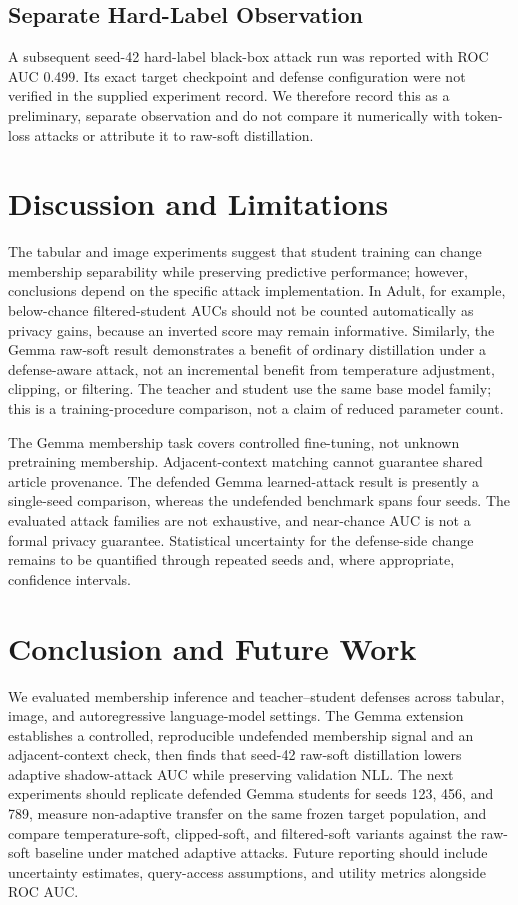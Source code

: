 \documentclass[conference]{IEEEtran}
\begin{document}
\subsection{Separate Hard-Label Observation}
A subsequent seed-42 hard-label black-box attack run was reported with ROC AUC 0.499. Its exact target checkpoint and defense configuration were not verified in the supplied experiment record. We therefore record this as a preliminary, separate observation and do not compare it numerically with token-loss attacks or attribute it to raw-soft distillation.

\section{Discussion and Limitations}
The tabular and image experiments suggest that student training can change membership separability while preserving predictive performance; however, conclusions depend on the specific attack implementation. In Adult, for example, below-chance filtered-student AUCs should not be counted automatically as privacy gains, because an inverted score may remain informative. Similarly, the Gemma raw-soft result demonstrates a benefit of ordinary distillation under a defense-aware attack, not an incremental benefit from temperature adjustment, clipping, or filtering. The teacher and student use the same base model family; this is a training-procedure comparison, not a claim of reduced parameter count.

The Gemma membership task covers controlled fine-tuning, not unknown pretraining membership. Adjacent-context matching cannot guarantee shared article provenance. The defended Gemma learned-attack result is presently a single-seed comparison, whereas the undefended benchmark spans four seeds. The evaluated attack families are not exhaustive, and near-chance AUC is not a formal privacy guarantee. Statistical uncertainty for the defense-side change remains to be quantified through repeated seeds and, where appropriate, confidence intervals.

\section{Conclusion and Future Work}
We evaluated membership inference and teacher--student defenses across tabular, image, and autoregressive language-model settings. The Gemma extension establishes a controlled, reproducible undefended membership signal and an adjacent-context check, then finds that seed-42 raw-soft distillation lowers adaptive shadow-attack AUC while preserving validation NLL. The next experiments should replicate defended Gemma students for seeds 123, 456, and 789, measure non-adaptive transfer on the same frozen target population, and compare temperature-soft, clipped-soft, and filtered-soft variants against the raw-soft baseline under matched adaptive attacks. Future reporting should include uncertainty estimates, query-access assumptions, and utility metrics alongside ROC AUC.
\end{document}
